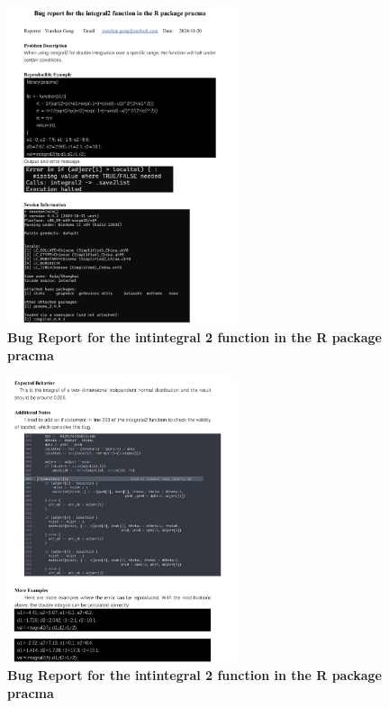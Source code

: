 \documentclass[cjjs]{ipart}
\theoremstyle{plain}
\begin{document}
\begin{figure}[H]
    \centering
    \includegraphics[width=0.60\textwidth]{11.png} 
    \caption{\textbf{Bug Report for the intintegral 2 function in the R package pracma}}
    \label{fig:dartboard}
\end{figure}

\begin{figure}[H]
    \centering
    \includegraphics[width=0.60\textwidth]{12.png} 
    \caption{\textbf{Bug Report for the intintegral 2 function in the R package pracma}}
    \label{fig:dartboard}
\end{figure}
\end{document}
